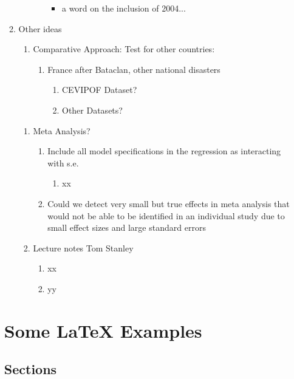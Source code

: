\documentclass[a4paper,man,natbib]{apa6}
\begin{document}
\begin{enumerate}
\begin{enumerate}
\begin{enumerate}
\begin{enumerate}
\begin{itemize}
				\item 
				a word on the inclusion of 2004...
			\end{itemize}
		\end{enumerate}
	\end{enumerate}
	
	\item Other ideas
	\begin{enumerate}
		\item Comparative Approach: Test for other countries: 
		\begin{enumerate}
			\item France after Bataclan, other national disasters
			\begin{enumerate}
				\item CEVIPOF Dataset?
				\item Other Datasets?
			\end{enumerate}
		\end{enumerate}
	\end{enumerate}
	\begin{enumerate}
		\item Meta Analysis?
		\begin{enumerate}
			\item Include all model specifications in the regression as interacting with s.e.
			\begin{enumerate}
				\item xx
			\end{enumerate}
			\item Could we detect very small but true effects in meta analysis that would not be able to be identified in an individual study due to small effect sizes and large standard errors
		\end{enumerate}
		\item Lecture notes Tom Stanley
		\begin{enumerate}
			\item xx
			\item yy 
		\end{enumerate}
	\end{enumerate}
\end{enumerate}


\section{Some \LaTeX{} Examples}
\label{sec:examples}

\subsection{Sections}


\end{enumerate}
\end{document}
